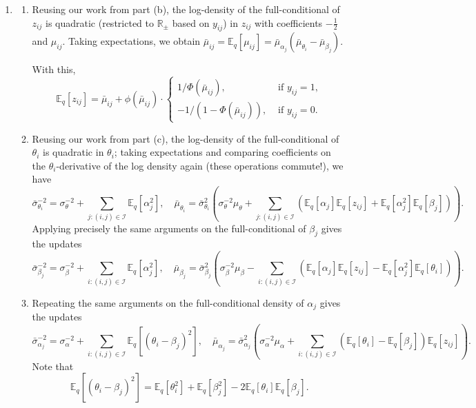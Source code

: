 \documentclass[12pt]{article}
\newcommand{\R}{\mathbb{R}}
\newcommand{\E}{\mathbb{E}}
\begin{document}
\begin{enumerate}[label=(\alph*)]
    \item \begin{enumerate}[label=(\roman*)]
        \item Reusing our work from part (b), the log-density of the
        full-conditional of $z_{ij}$ is quadratic (restricted to $\R_{\pm}$
        based on $y_{ij}$) in $z_{ij}$ with coefficients $-\frac{1}{2}$ and
        $\mu_{ij}$.
        Taking expectations, we obtain $\bar{\mu}_{ij} = \E_q[\mu_{ij}] =
        \bar{\mu}_{\alpha_j}(\bar{\mu}_{\theta_i} - \bar{\mu}_{\beta_j})$.

        With this, \[
            \E_q[z_{ij}] = \bar{\mu}_{ij} + \phi(\bar{\mu}_{ij})\cdot \begin{cases}
                1 /\Phi(\bar{\mu}_{ij}), &\text{ if } y_{ij} = 1, \\
                -1 / (1 - \Phi(\bar{\mu}_{ij})), &\text{ if } y_{ij} = 0.
            \end{cases}
        \]


        \item Reusing our work from part (c), the log-density of the
        full-conditional of $\theta_i$ is quadratic in $\theta_i$; taking
        expectations and comparing coefficients on the $\theta_i$-derivative of
        the log density again (these operations commute!), we have \[
            \bar{\sigma}_{\theta_i}^{-2} = \sigma_{\theta}^{-2} + \sum_{j: (i, j) \in \mathscr{I}} \E_q[\alpha_j^2], \quad
            \bar{\mu}_{\theta_i} = \bar{\sigma}_{\theta_i}^2\left(\sigma_\theta^{-2}\mu_\theta + \sum_{j: (i, j) \in \mathscr{I}} (\E_q[\alpha_j]\E_q[z_{ij}] + \E_q[\alpha_j^2]\E_q[\beta_j])\right).
        \] Applying precisely the same arguments on the full-conditional of
        $\beta_j$ gives the updates \[
            \bar{\sigma}_{\beta_j}^{-2} = \sigma_{\beta}^{-2} + \sum_{i: (i, j) \in \mathscr{I}} \E_q[\alpha_j^2], \quad
            \bar{\mu}_{\beta_j} = \bar{\sigma}_{\beta_j}^2\left(\sigma_{\beta}^{-2}\mu_\beta - \sum_{i: (i, j) \in \mathscr{I}} (\E_q[\alpha_j]\E_q[z_{ij}] - \E_q[\alpha_j^2]\E_q[\theta_i])\right).
        \] 

        \item Repeating the same arguments on the full-conditional density of
        $\alpha_j$ gives the updates \[
            \bar{\sigma}_{\alpha_j}^{-2} = \sigma_{\alpha}^{-2} + \sum_{i: (i, j) \in \mathscr{I}} \E_q[(\theta_i - \beta_j)^2], \quad
            \bar{\mu}_{\alpha_j} = \bar{\sigma}_{\alpha_j}^2\left(\sigma_{\alpha}^{-2}\mu_\alpha + \sum_{i: (i, j) \in \mathscr{I}} (\E_q[\theta_i] - \E_q[\beta_j])\E_q[z_{ij}]\right).
        \] Note that \[
            \E_q[(\theta_i - \beta_j)^2] = \E_q[\theta_i^2] + \E_q[\beta_j^2] - 2\E_q[\theta_i]\E_q[\beta_j].
        \] 
    \end{enumerate}

\end{enumerate}
\end{document}
